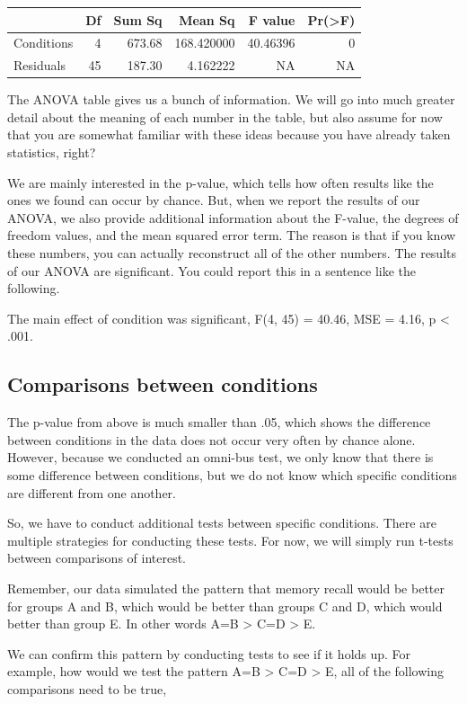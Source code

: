 \begin{tabular}{l|r|r|r|r|r}
\hline
  & Df & Sum Sq & Mean Sq & F value & Pr(>F)\\
\hline
Conditions & 4 & 673.68 & 168.420000 & 40.46396 & 0\\
\hline
Residuals & 45 & 187.30 & 4.162222 & NA & NA\\
\hline
\end{tabular}

The ANOVA table gives us a bunch of information. We will go into much
greater detail about the meaning of each number in the table, but also
assume for now that you are somewhat familiar with these ideas because
you have already taken statistics, right?

We are mainly interested in the p-value, which tells how often results
like the ones we found can occur by chance. But, when we report the
results of our ANOVA, we also provide additional information about the
F-value, the degrees of freedom values, and the mean squared error term.
The reason is that if you know these numbers, you can actually
reconstruct all of the other numbers. The results of our ANOVA are
significant. You could report this in a sentence like the following.

The main effect of condition was significant, F(4, 45) = 40.46, MSE =
4.16, p \textless{} .001.

\subsection{Comparisons between
conditions}\label{comparisons-between-conditions}

The p-value from above is much smaller than .05, which shows the
difference between conditions in the data does not occur very often by
chance alone. However, because we conducted an omni-bus test, we only
know that there is some difference between conditions, but we do not
know which specific conditions are different from one another.

So, we have to conduct additional tests between specific conditions.
There are multiple strategies for conducting these tests. For now, we
will simply run t-tests between comparisons of interest.

Remember, our data simulated the pattern that memory recall would be
better for groups A and B, which would be better than groups C and D,
which would better than group E. In other words A=B \textgreater{} C=D
\textgreater{} E.

We can confirm this pattern by conducting tests to see if it holds up.
For example, how would we test the pattern A=B \textgreater{} C=D
\textgreater{} E, all of the following comparisons need to be true,

